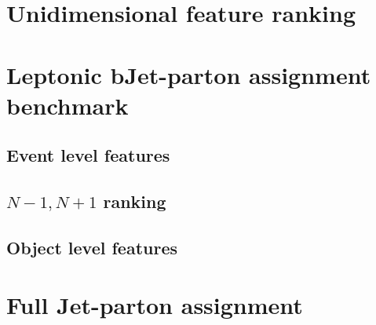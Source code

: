 \label{sec:kin}
\vspace{-1cm}
\minitoc

\section{Unidimensional feature ranking}
\section{Leptonic bJet-parton assignment benchmark}
\subsection{Event level features}
\subsection{{$N-1,N+1$} ranking}
\subsection{Object level features}
\section{Full Jet-parton assignment}

